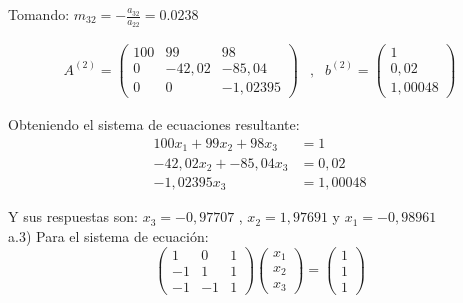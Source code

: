 Tomando: $m_{32}=-\frac{a_{32}}{a_{22}}=0.0238$

\begin{equation*}
    \begin{matrix}
        A^{(2)}= \begin{pmatrix}
            100 & 99 & 98 \\
            0 & -42,02 & -85,04 \\
            0 & 0 & -1,02395
        \end{pmatrix}
        & , &
        b^{(2)}=\begin{pmatrix}
            1 \\
            0,02 \\
            1,00048
        \end{pmatrix}
    \end{matrix}
\end{equation*}

Obteniendo el sistema de ecuaciones resultante:
\begin{align*}
    100x_1+99x_2+98x_3 &= 1 \\
    -42,02x_2+-85,04x_3 &= 0,02 \\
    -1,02395x_3 &= 1,00048
\end{align*}

Y sus respuestas son: $x_3=-0,97707$ , $x_2=1,97691$ y $x_1=-0,98961$\\

a.3) Para el sistema de ecuación:\\
\begin{equation*}
    \begin{pmatrix}
        1 & 0 & 1 \\
        -1 & 1 & 1 \\
        -1 & -1 & 1
    \end{pmatrix}
    \begin{pmatrix}
        x_1 \\
        x_2 \\
        x_3
    \end{pmatrix}    
    =    
    \begin{pmatrix}
        1 \\
        1 \\
        1
    \end{pmatrix}
\end{equation*}

